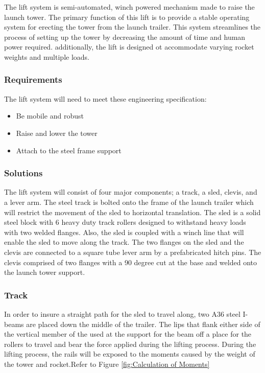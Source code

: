 \documentclass[10pt,a4paper]{article}
\begin{document}
	The lift system is semi-automated, winch powered mechanism made to raise the launch tower. The primary function of this lift is to provide a stable operating system for erecting the tower from the launch trailer. This system streamlines the process of setting up the tower by decreasing the amount of time and human power required. additionally, the lift is designed ot accommodate varying rocket weights and multiple loads. \\
	
\subsubsection{Requirements}
The lift system will need to meet these engineering specification:
\begin{itemize}
	\item Be mobile and robust
	\item Raise and lower the tower
	\item Attach to the steel frame support
\end{itemize}

\subsubsection{Solutions}
	The lift system will consist of four major components; a track, a sled, clevis, and a lever arm. The steel track is bolted onto the frame of the launch trailer which will restrict the movement of the sled to horizontal translation. The sled is a solid steel block with 6 heavy duty track rollers designed to withstand heavy loads with two welded flanges. Also, the sled is coupled with a winch line that will enable the sled to move along the track. The two flanges on the sled and the clevis are connected to a square tube lever arm by a prefabricated hitch pins. The clevis comprised of two flanges with a 90 degree cut at the base and welded onto the launch tower support.\\
\subsubsection{Track}
In order to insure a straight path for the sled to travel along, two A36 steel I-beams are placed down the middle of the trailer. The lips that flank either side of the vertical member of the used at the support for the beam off a place for the rollers to travel and bear the force applied during the lifting process. During the lifting process, the rails will be exposed to the moments caused by the weight of the tower and rocket.Refer to Figure  \ref{fig:Calculation of Moments}\\
\end{document}
